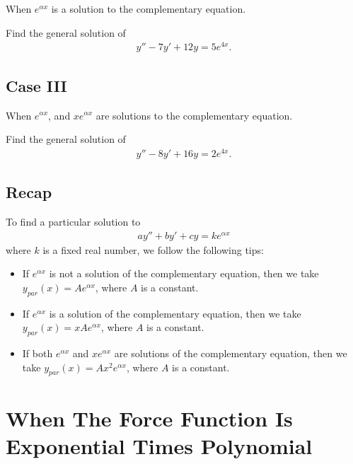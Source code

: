 \documentclass[12pt,a4paper]{article}
\newcounter{example}[section]
\begin{document}
When $e^{\alpha x}$ is a solution to the complementary equation.

\begin{example}
Find the general solution of
	\begin{align*}
	y'' - 7y' + 12 y = 5 e^{4x} .
	\end{align*}
\end{example}

\newpage

\phantom{2}

\newpage

\subsection{Case III}
When $e^{\alpha x}$, and $xe^{\alpha x}$ are solutions to the complementary equation.

\begin{example}
Find the general solution of
	\begin{align*}
	y'' - 8 y' + 16y = 2e^{4x} .
	\end{align*}
\end{example}

\newpage

\phantom{2}

\newpage

\subsection{Recap}
To find a particular solution to
	\begin{align*}
	ay'' + by' + cy = k e^{\alpha x}
	\end{align*}
where $k$ is a fixed real number, we follow the following tips:
	\begin{itemize}
	\item If $e^{\alpha x}$ is not a solution of the complementary equation, then we take $y_{par} (x) = Ae^{\alpha x}$, where $A$ is a constant.
	\item If $e^{\alpha x}$ is a solution of the complementary equation, then we take $y_{par} (x) = xAe^{\alpha x}$, where $A$ is a constant.
	\item If both $e^{\alpha x}$ and $x e^{\alpha x}$ are solutions of the complementary equation, then we take $y_{par} (x) = Ax^2 e^{\alpha x}$, where $A$ is a constant.
	\end{itemize}

\newpage

\section{When The Force Function Is Exponential Times Polynomial}
\end{document}
